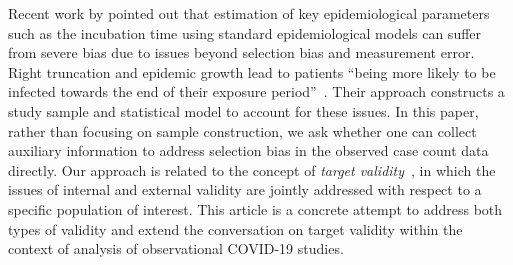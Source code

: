 \documentclass[11pt]{amsart}
\numberwithin{equation}{section}
\theoremstyle{plain}
\begin{document}
Recent work by \cite{Zhao2021} pointed out that estimation of key epidemiological parameters such as the incubation time using standard epidemiological models can suffer from severe bias due to issues beyond selection bias and measurement error.  Right truncation and epidemic growth lead to patients ``being more likely to be infected towards the end of their exposure period''~\citep[pp. 3]{Zhao2021}.  Their approach constructs a study sample and statistical model to account for these issues.  In this paper, rather than focusing on sample construction, we ask whether one can collect auxiliary information to address selection bias in the observed case count data directly. Our approach is related to the concept of \emph{target validity}~\citep{Westreich2018}, in which the issues of internal and external validity are jointly addressed with respect to a specific population of interest.  This article is a concrete attempt to address both types of validity and extend the conversation on target validity within the context of analysis of observational COVID-19 studies.





\end{document}

